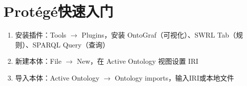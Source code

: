 \section{Protégé快速入门}

\begin{enumerate}
\item 安装插件：Tools \(\rightarrow\) Plugins，安装 OntoGraf（可视化）、SWRL Tab（规则）、SPARQL Query（查询）
\item 新建本体：File \(\rightarrow\) New，在 Active Ontology 视图设置 IRI
\item 导入本体：Active Ontology \(\rightarrow\) Ontology imports，输入IRI或本地文件
\end{enumerate}
